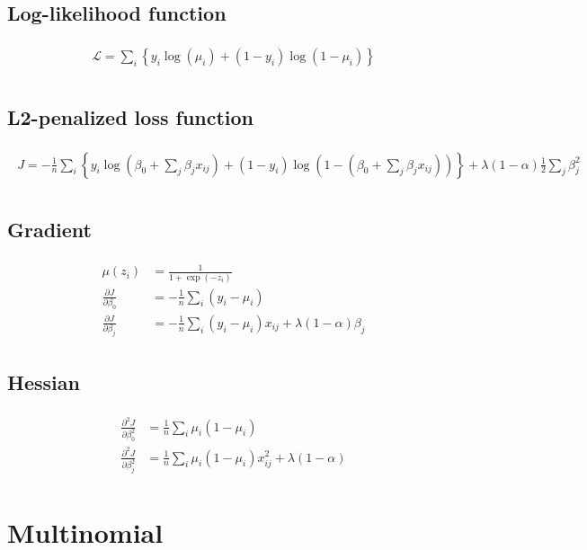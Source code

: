 \documentclass[a4paper]{article}
\begin{document}
\subsection{Log-likelihood function}
\def \binomiallogL{
\begin{align}
\begin{split}
\mathcal{L} = \sum_i \left\{ y_i \log(\mu_i) + (1-y_i) \log(1 - \mu_i) \right\} \\
\end{split}
\end{align}
}
\binomiallogL

\subsection{L2-penalized loss function}
\def \binomialloss{
\begin{align}
\begin{split}
J = -\frac{1}{n}\sum_i \left\{ y_i \log(\beta_0 + \sum_j \beta_j x_{ij}) + (1-y_i) \log(1 - (\beta_0 + \sum_j \beta_j x_{ij})) \right\}
+ \lambda (1 - \alpha) \frac{1}{2}\sum_j \beta_j^2\\
\end{split}
\end{align}
}
\binomialloss

\subsection{Gradient}
\def \binomialgrad{
\begin{align}
\begin{split}
\mu(z_i) &= \frac{1}{1 + \exp(-z_i)} \\
\frac{\partial J}{\partial \beta_0} &= -\frac{1}{n}\sum_i (y_i - \mu_i) \\
\frac{\partial J}{\partial \beta_j} &= -\frac{1}{n}\sum_i (y_i - \mu_i) x_{ij}
+ \lambda (1 - \alpha) \beta_j 
\end{split}
\end{align}}
\binomialgrad

\subsection{Hessian}
\def \binomialhess{
\begin{align}
\begin{split}
\frac{\partial^2 J}{\partial \beta_0^2} &= \frac{1}{n}\sum_i \mu_i (1 - \mu_i) \\
\frac{\partial^2 J}{\partial \beta_j^2} &=  \frac{1}{n}\sum_i \mu_i (1 - \mu_i) x_{ij}^2
+ \lambda (1 - \alpha)
\end{split}
\end{align}}
\binomialhess

\section{Multinomial}
\end{document}
